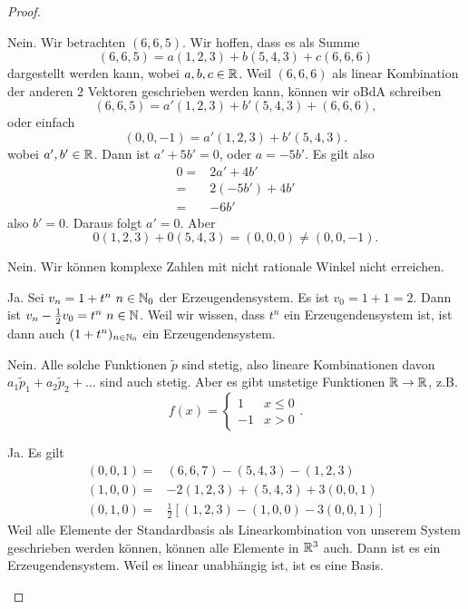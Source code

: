 \begin{proof}
	\begin{parts}
	\item Nein. Wir betrachten $(6,6,5)$. Wir hoffen, dass es als Summe
		\[
			(6,6,5)=a(1,2,3)+b(5,4,3)+c(6,6,6)
		\]
		dargestellt werden kann, wobei $a,b,c\in \mathbb{R}$. Weil $(6,6,6)$ als linear Kombination der anderen $2$ Vektoren geschrieben werden kann, können wir oBdA schreiben
		\[
			(6,6,5)=a'(1,2,3)+b'(5,4,3)+(6,6,6)
		,\]
		oder einfach
\[
	(0,0,-1)=a'(1,2,3)+b'(5,4,3)
.\] 
		wobei $a',b'\in \mathbb{R}$. Dann ist $a'+5b'=0$, oder $a=-5b'$. Es gilt also
		\begin{align*}
			0=&2a'+4b'\\
			=&2(-5b')+4b'\\
			=& -6b'
		\end{align*}
		also $b'=0$. Daraus folgt $a'=0$. Aber
		\[
		0(1,2,3)+0(5,4,3)=(0,0,0)\neq (0,0,-1)
		.\] 
	\item Nein. Wir können komplexe Zahlen mit nicht rationale Winkel nicht erreichen. 
	\item Ja. Sei $v_n=1+t^n~n\in \mathbb{N}_0$ der Erzeugendensystem. Es ist $v_0=1+1=2$. Dann ist $v_n-\frac{1}{2}v_0=t^n~n\in \mathbb{N}$. Weil wir wissen, dass $t^n$ ein Erzeugendensystem ist, ist dann auch $(1+t^n)_{n\in \mathbb{N}_0}$ ein Erzeugendensystem.
	\item Nein. Alle solche Funktionen $\tilde{p}$ sind stetig, also lineare Kombinationen davon $a_1\tilde{p}_1+a_2\tilde{p}_2+\dots$ sind auch stetig. Aber es gibt unstetige Funktionen $\mathbb{R}\to \mathbb{R}$, z.B.
		\[
		f(x)=\begin{cases}
			1 & x \le 0\\
			-1 & x > 0
		\end{cases}
		.\] 
	\item Ja. Es gilt
	\begin{align*}
		(0,0,1)=&(6,6,7)-(5,4,3)-(1,2,3)\\
		(1,0,0)=&-2(1,2,3)+(5,4,3)+3(0,0,1)\\
		(0,1,0)=&\frac{1}{2}\left[ (1,2,3)-(1,0,0)-3(0,0,1) \right] 
	\end{align*}
	Weil alle Elemente der Standardbasis als Linearkombination von unserem System geschrieben werden können, können alle Elemente in $\mathbb{R}^3$ auch. Dann ist es ein Erzeugendensystem. Weil es linear unabhängig ist, ist es eine Basis.\qedhere
	\end{parts}
\end{proof}
